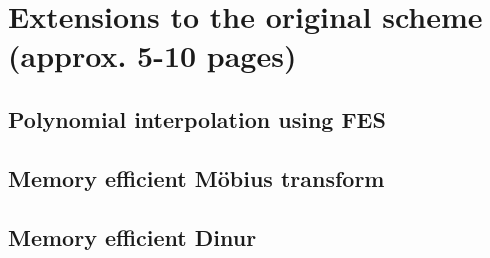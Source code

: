 \section{Extensions to the original scheme (approx. 5-10 pages)} \label{sec:ext}

\subsection{Polynomial interpolation using FES} \label{sec:ext:fes_interp}

\subsection{Memory efficient Möbius transform} \label{sec:ext:mem_mob}

\subsection{Memory efficient Dinur} \label{sec:ext:mem_dinur}

\newpage
